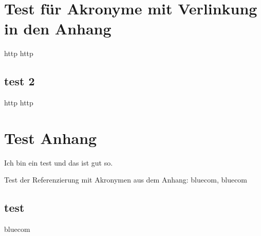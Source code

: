 \documentclass[.\jobname.tex]{subfiles}
\begin{document}
\chapter{Test für Akronyme mit Verlinkung in den Anhang}
\gls{http} \acrshort{http}
%
\section{test 2}
%
\gls{http} \acrshort{http}
%
\chapter{Test Anhang}\label{sec: test anhang}
%
Ich bin ein test und das ist gut so.\par
%
Test der Referenzierung mit Akronymen aus dem Anhang: \gls{bluecom}, \acrshort{bluecom}
%
\section{test}
%
\acrshort{bluecom}
%
\blinddocument
%
\end{document}

